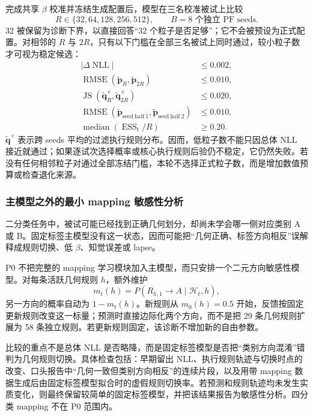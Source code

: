 完成共享 $\beta$ 校准并冻结生成配置后，模型在三名校准被试上比较
\begin{equation}
R\in\{32,64,128,256,512\},
\qquad B=8\text{ 个独立 PF seeds}.
\label{eq:m0815-particle-panel}
\end{equation}
32 被保留为诊断下界，以直接回答“32 个粒子是否足够”；它不会被预设为正式配置。对相邻的 $R$ 与 $2R$，只有以下门槛在全部三名被试上同时通过，较小粒子数才可视为稳定候选：
\begin{align}
|\Delta\operatorname{NLL}|&\leq0.002,
\nonumber\\
\operatorname{RMSE}(\widetilde{\mathbf p}_{R},
\widetilde{\mathbf p}_{2R})&\leq0.010,
\nonumber\\
\operatorname{JS}(\widetilde{\mathbf q}^{\,e}_{R},
\widetilde{\mathbf q}^{\,e}_{2R})&\leq0.020,
\nonumber\\
\operatorname{RMSE}(\widetilde{\mathbf p}_{\mathrm{seed\ half\ 1}},
\widetilde{\mathbf p}_{\mathrm{seed\ half\ 2}})&\leq0.010,
\nonumber\\
\operatorname{median}(\operatorname{ESS}_t/R)&\geq0.20.
\label{eq:m0815-pf-gates}
\end{align}
$\widetilde{\mathbf q}^{\,e}$ 表示跨 seeds 平均的过滤执行规则分布。因而，低粒子数不能只因总体 NLL 接近就通过；如果逐试次选择概率或核心执行规则后验仍不稳定，它仍然失败。若没有任何相邻粒子对通过全部冻结门槛，本轮不选择正式粒子数，而是增加数值预算或检查退化来源。


\subsubsection{主模型之外的最小 mapping 敏感性分析}

二分类任务中，被试可能已经找到正确几何划分，却尚未学会哪一侧对应类别 A 或 B。固定标签主模型没有这一状态，因而可能把“几何正确、标签方向相反”误解释成规则切换、低 $\beta$、知觉误差或 lapse。

P0 不把完整的 mapping 学习模块加入主模型，而只安排一个二元方向敏感性模型。对每条活跃几何规则 $h$，额外维护
\begin{equation}
m_t(h)=P(R_{h,1}\rightarrow A\mid\mathcal H_t,h),
\label{eq:m0815-mapping-belief}
\end{equation}
另一方向的概率自动为 $1-m_t(h)$。新规则从 $m_0(h)=0.5$ 开始，反馈按固定更新规则改变这一标量；预测时直接边际化两个方向，而不是把 29 条几何规则扩展为 58 条独立规则。若更新规则固定，该诊断不增加新的自由参数。

比较的重点不是总体 NLL 是否略降，而是固定标签模型是否把“类别方向混淆”错判为几何规则切换。具体检查包括：早期留出 NLL、执行规则轨迹与切换时点的改变、口头报告中“几何一致但类别方向相反”的连续片段，以及用带 mapping 数据生成后由固定标签模型拟合时的虚假规则切换率。若预测和规则轨迹均未发生实质变化，则最终保留较简单的固定标签模型，并把该结果报告为敏感性分析。四分类 mapping 不在 P0 范围内。


